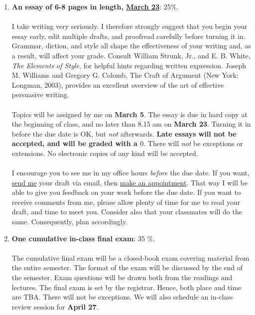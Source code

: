 \documentclass[letterpaper]{article}
\begin{document}
\begin{enumerate}
	\item {\bf An essay of 6-8 pages in length, \underline{March 23}}: 25\%. 
	\\
	\\
	I take writing very seriously. I therefore strongly suggest that you begin your essay early, edit multiple drafts, and proofread carefully before turning it in. Grammar, diction, and style all shape the effectiveness of your writing and, as a result, will affect your grade. Consult William Strunk, Jr., and E. B. White, \emph{The Elements of Style}, for helpful hints regarding written expression. Joseph M. Williams and Gregory G. Colomb, The Craft of Argument (New York: Longman, 2003), provides an excellent overview of the art of effective persuasive writing.
	\\
	\\
	Topics will be assigned by me on {\bf March 5}. The essay is due in hard copy at the beginning of class, and no later than 8.15 am on {\bf March 23}. Turning it in before the due date is OK, but \emph{not} afterwards. {\bf Late essays will not be accepted, and will be graded with a $0$}. There will \emph{not} be exceptions or extensions. No electronic copies of any kind will be accepted.
	\\
	\\
	I encourage you to see me in my office hours \emph{before} the due date. If you want, \href{mailto:\filetext}{send me} your draft via email, then \href{https://calendly.com/bahamonde/officehours}{make an appointment}. That way I will be able to give you feedback on your work before the due date. If you want to receive comments from me, please allow plenty of time for me to read your draft, and time to meet you. Consider also that your classmates will do the same. Consequently, plan accordingly.

	\item {\bf One cumulative in-class final exam}: 35 \%. 
	\\
	\\
	The cumulative final exam will be a closed-book exam covering material from the entire semester. The format of the exam will be discussed by the end of the semester. Exam questions will be drawn both from the readings and lectures. The final exam is set by the registrar. Hence, both place and time are TBA. There will not be exceptions. We will also schedule an in-class review session for {\bf April 27}.

\end{enumerate}
\end{document}
